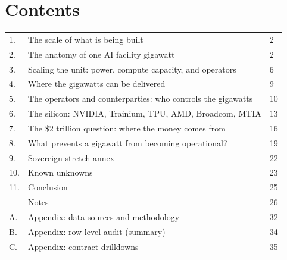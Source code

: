 \documentclass[11pt,a4paper]{article}
\begin{document}
\newpage
\hypersetup{pageanchor=true}
\pagestyle{fancy}
\setcounter{page}{2}

\section*{Contents}

\begin{spacing}{1.15}
\begin{tabular}{@{}R{0.6cm} L{11cm} R{1cm}@{}}
\textcolor{softGrey}{1.} & The scale of what is being built & 2 \\
\textcolor{softGrey}{2.} & The anatomy of one AI facility gigawatt & 2 \\
\textcolor{softGrey}{3.} & Scaling the unit: power, compute capacity, and operators & 6 \\
\textcolor{softGrey}{4.} & Where the gigawatts can be delivered & 9 \\
\textcolor{softGrey}{5.} & The operators and counterparties: who controls the gigawatts & 10 \\
\textcolor{softGrey}{6.} & The silicon: NVIDIA, Trainium, TPU, AMD, Broadcom, MTIA & 13 \\
\textcolor{softGrey}{7.} & The \$2 trillion question: where the money comes from & 16 \\
\textcolor{softGrey}{8.} & What prevents a gigawatt from becoming operational? & 19 \\
\textcolor{softGrey}{9.} & Sovereign stretch annex & 22 \\
\textcolor{softGrey}{10.} & Known unknowns & 23 \\
\textcolor{softGrey}{11.} & Conclusion & 25 \\
\textcolor{softGrey}{---} & Notes & 26 \\
\textcolor{softGrey}{A.} & Appendix: data sources and methodology & 32 \\
\textcolor{softGrey}{B.} & Appendix: row-level audit (summary) & 34 \\
\textcolor{softGrey}{C.} & Appendix: contract drilldowns & 35 \\
\end{tabular}
\end{spacing}

\vspace{2cm}

\end{document}
